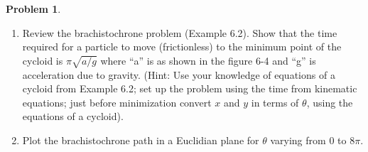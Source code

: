 \documentclass[10pt]{article}
\theoremstyle{definition}
\newtheorem{problem}{Problem}
\begin{document}
\begin{problem}~
\begin{enumerate}[label=(\alph*)]
  \item Review the brachistochrone problem (Example 6.2). Show that the time required for a
        particle to move (frictionless) to the minimum point of the cycloid is $\pi\sqrt{a/g}$ where ``a'' is as
        shown in the figure 6-4 and ``g'' is acceleration due to gravity. (Hint: Use your knowledge
        of equations of a cycloid from Example 6.2; set up the problem using the time from
        kinematic equations; just before minimization convert $x$ and $y$ in terms of $\theta$, using the
        equations of a cycloid).
  \item Plot the brachistochrone path in a Euclidian plane for $\theta$ varying from $0$ to $8\pi$.
\end{enumerate}
\end{problem}
\end{document}
